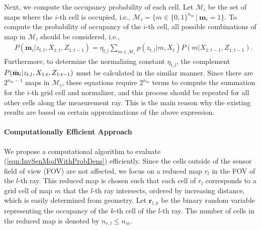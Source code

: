 \documentclass[smallextended]{svjour3}       %
\newcommand{\refeqn}[1]{(\ref{eqn:#1})}
\begin{document}
Next, we compute the occupancy probability of each cell. Let $\mathcal{M}_i$ be the set of maps where the $i$-th cell is occupied, i.e., $\mathcal{M}_i =\{m\in\{0,1\}^{{n_m}}\,|\ \mathbf{m}_i=1\}$. To compute the probability of occupancy of the $i$-th cell, all possible combinations of map in $\mathcal{M}_i$ should be considered, i.e., 
\begin{align}
\label{eqn:InvSenModWithProbDens}
&P(\mathbf{m}_i|z_{t,l},X_{1:t},Z_{1:t-1})%
=\eta_{t,l}\sum_{m\in\mathcal{M}_i}p(z_{t,l}|m,X_{t})P(m|X_{1:t-1},Z_{1:t-1}).
\end{align}
Furthermore, to determine the normalizing constant $\eta_{t,l}$, the complement $\\P(\bar{\mathbf{m}}_i|z_{t,l},X_{1:t},Z_{1:t-1})$ must be calculated in the similar manner. Since there are $2^{n_{m}-1}$ maps in $\mathcal{M}_i$, these equations require $2^{n_m}$ terms to compute the summation for the $i$-th grid cell and normalizer, and this process should be repeated for all other cells along the measurement ray. This is the main reason why the existing results are based on certain approximations of the above expression. 

	
\paragraph{Computationally Efficient Approach}

We propose a computational algorithm to evaluate \refeqn{InvSenModWithProbDens} efficiently. 
Since the cells outside of the sensor field of view (FOV) are not affected, we focus on a reduced map $r_l$ in the FOV of the $l$-th ray. This reduced map is chosen such that each cell of $r_l$ corresponds to a grid cell of map $m$ that the $l$-th ray intersects, ordered by increasing distance, which is easily determined from geometry. Let $\mathbf{r}_{l,k}$ be the binary random variable representing the occupancy of the $k$-th cell of the $l$-th ray. The number of cells in the reduced map is denoted by $n_{r,l}\leq n_m$.
\end{document}
